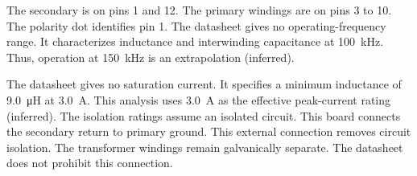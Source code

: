 The secondary is on pins 1 and 12. The primary windings are on pins 3 to 10.
The polarity dot identifies pin 1. The datasheet gives no operating-frequency
range. It characterizes inductance and interwinding capacitance at
\SI{100}{\kilo\hertz}. Thus, operation at \SI{150}{\kilo\hertz} is an
extrapolation (inferred).

The datasheet gives no saturation current. It specifies a minimum inductance
of \SI{9.0}{\micro\henry} at \SI{3.0}{\ampere}. This analysis uses
\SI{3.0}{\ampere} as the effective peak-current rating (inferred). The
isolation ratings assume an isolated circuit. This board connects the
secondary return to primary ground. This external connection removes circuit
isolation. The transformer windings remain galvanically separate. The
datasheet does not prohibit this connection.
